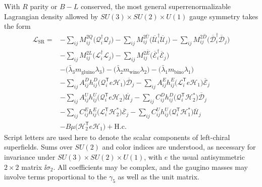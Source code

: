 With \(R\) parity or \(B-L\) conserved, the most general
superrenormalizable Lagrangian density allowed by
\(SU(3)\times SU(2)\times U(1)\) gauge symmetry takes
the form
\begin{equation}
  \begin{aligned}
  \mathcal{L}_{\mathrm{SR}}={}&
  -\sum_{ij}M_{ij}^{2Q}
    \bigl(\mathcal{Q}_i^\dagger\mathcal{Q}_j\bigr)
  -\sum_{ij}M_{ij}^{2\bar U}
    \bigl(\overline{\mathcal{U}}_i^\dagger
          \overline{\mathcal{U}}_j\bigr)
  -\sum_{ij}M_{ij}^{2\bar D}
    \bigl(\overline{\mathcal{D}}_i^\dagger
          \overline{\mathcal{D}}_j\bigr)
  \\
  &-\sum_{ij}M_{ij}^{2L}
    \bigl(\mathcal{L}_i^\dagger\mathcal{L}_j\bigr)
  -\sum_{ij}M_{ij}^{2\bar E}
    \bigl(\overline{\mathcal{E}}_i^\dagger
          \overline{\mathcal{E}}_j\bigr)
  \\
  &-\bigl(\bar{\lambda}_3m_{\mathrm{gluino}}\lambda_3\bigr)
  -\bigl(\bar{\lambda}_2m_{\mathrm{wino}}\lambda_2\bigr)
  -\bigl(\bar{\lambda}_1m_{\mathrm{bino}}\lambda_1\bigr)
  \\
  &-\sum_{ij}A_{ij}^{D}h_{ij}^{D}
    \bigl(\mathcal{Q}_i^{\mathsf T}e\mathcal{H}_1\bigr)
    \overline{\mathcal{D}}_j
  -\sum_{ij}A_{ij}^{E}h_{ij}^{E}
    \bigl(\mathcal{L}_i^{\mathsf T}e\mathcal{H}_1\bigr)
    \overline{\mathcal{E}}_j
  \\
  &-\sum_{ij}A_{ij}^{U}h_{ij}^{U}
    \bigl(\mathcal{Q}_i^{\mathsf T}e\mathcal{H}_2\bigr)
    \overline{\mathcal{U}}_j
  -\sum_{ij}C_{ij}^{D}h_{ij}^{D}
    \bigl(\mathcal{Q}_i^{\mathsf T}\mathcal{H}_2^*\bigr)
    \overline{\mathcal{D}}_j
  \\
  &-\sum_{ij}C_{ij}^{E}h_{ij}^{E}
    \bigl(\mathcal{L}_i^{\mathsf T}\mathcal{H}_2^*\bigr)
    \overline{\mathcal{E}}_j
  -\sum_{ij}C_{ij}^{U}h_{ij}^{U}
    \bigl(\mathcal{Q}_i^{\mathsf T}\mathcal{H}_1^*\bigr)
    \overline{\mathcal{U}}_j
  \\
  &-B\mu\bigl(\mathcal{H}_2^{\mathsf T}e\mathcal{H}_1\bigr)
  +\mathrm{H.c.}
  \end{aligned}
  \tag{28.4.1}\label{eq:28.4.1}
\end{equation}
Script letters are used here to denote the scalar components of
left-chiral superfields. Sums over \(SU(2)\) and color indices are
understood, as necessary for invariance under
\(SU(3)\times SU(2)\times U(1)\), with \(e\) the usual
antisymmetric \(2\times2\) matrix \(\ii\sigma_2\). All coefficients
may be complex, and the gaugino masses may involve terms proportional to
the \(\gamma_5\) as well as the unit matrix.

